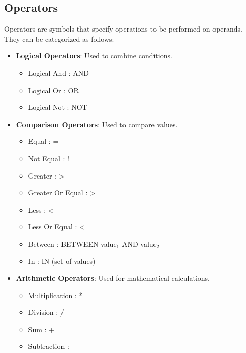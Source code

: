 \subsection{Operators}
\begin{tcolorbox}[title = Definition]
Operators are symbols that specify operations to be performed on operands. They can be categorized as follows:
\begin{itemize}
    \item \textbf{Logical Operators}: Used to combine conditions.
          \begin{itemize} 
              \item Logical And : AND 
              \item Logical Or : OR 
              \item Logical Not : NOT 
              \end{itemize} 
    
    \item \textbf{Comparison Operators}: Used to compare values.
    \begin{itemize}
             \item Equal : = 
             \item Not Equal : != 
             \item Greater : \textgreater
             \item Greater Or Equal : \textgreater= 
             \item Less : \textless
             \item Less Or Equal : \textless= 
             \item Between : BETWEEN value$_{1}$ AND value$_{2}$
             \item In : IN (set of values)
             \end{itemize} 

    \item \textbf{Arithmetic Operators}: Used for mathematical calculations.
    \begin{itemize} 
           \item Multiplication : *
           \item Division : / 
           \item Sum : + 
           \item Subtraction : -
           \end{itemize}
   \end{itemize}
\end{tcolorbox}
